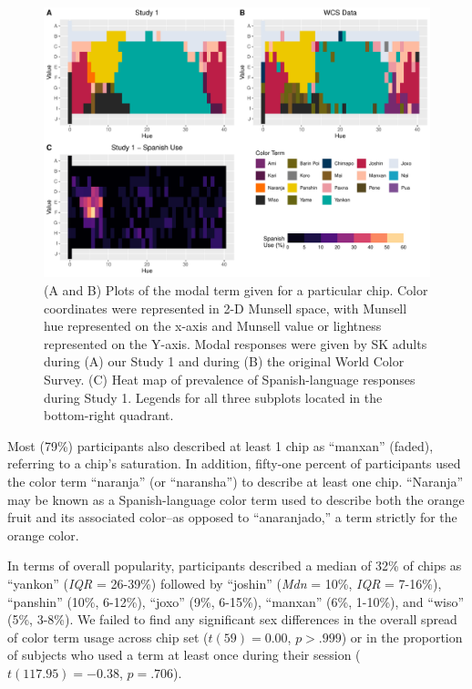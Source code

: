 \documentclass[
  ,apa7,floatsintext]{apa6}
\begin{document}
\begin{figure}
\centering
\includegraphics{amazon_color_files/figure-latex/study1-figure-1.pdf}
\caption{\label{fig:study1-figure}(A and B) Plots of the modal term given for a particular chip. Color coordinates were represented in 2-D Munsell space, with Munsell hue represented on the x-axis and Munsell value or lightness represented on the Y-axis. Modal responses were given by SK adults during (A) our Study 1 and during (B) the original World Color Survey. (C) Heat map of prevalence of Spanish-language responses during Study 1. Legends for all three subplots located in the bottom-right quadrant.}
\end{figure}

Most (79\%) participants also described at least 1 chip as ``manxan'' (faded), referring to a chip's saturation. In addition, fifty-one percent of participants used the color term ``naranja'' (or ``naransha'') to describe at least one chip. ``Naranja'' may be known as a Spanish-language color term used to describe both the orange fruit and its associated color--as opposed to ``anaranjado,'' a term strictly for the orange color.

In terms of overall popularity, participants described a median of 32\% of chips as ``yankon'' (\emph{IQR} = 26-39\%) followed by ``joshin'' (\emph{Mdn} = 10\%, \emph{IQR} = 7-16\%), ``panshin'' (10\%, 6-12\%), ``joxo'' (9\%, 6-15\%), ``manxan'' (6\%, 1-10\%), and ``wiso'' (5\%, 3-8\%). We failed to find any significant sex differences in the overall spread of color term usage across chip set (\(t(59) = 0.00\), \(p > .999\)) or in the proportion of subjects who used a term at least once during their session (\(t(117.95) = -0.38\), \(p = .706\)).
\end{document}
